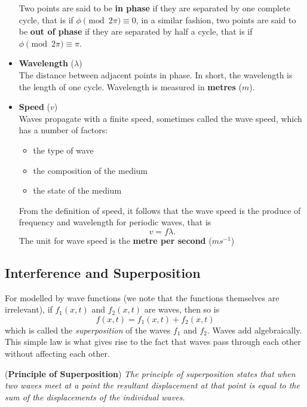 \begin{itemize}
    Two points are said to be \textbf{in phase} if they are separated by one complete cycle, that is if $\phi \pmod{2\pi} \equiv 0$, in a similar fashion, two points are said to be \textbf{out of phase} if they are separated by half a cycle, that is if $\phi \pmod{2\pi} \equiv \pi$. 
    \item \textbf{Wavelength} ($\lambda$) \\
    The distance between adjacent points in phase. In short, the wavelength is the length of one cycle. Wavelength is measured in \textbf{metres} ($m$).
    \item \textbf{Speed} ($v$) \\
    Waves propagate with a finite speed, sometimes called the wave speed, which has a number of factors:
    \begin{itemize}
        \item the type of wave
        \item the composition of the medium
        \item the state of the medium
    \end{itemize}
    From the definition of speed, it follows that the wave speed is the produce of frequency and wavelength for periodic waves, that is 
    \begin{equation}
        v = f \lambda.
    \end{equation}
    The unit for wave speed is the \textbf{metre per second} ($ms^{-1}$)
\end{itemize}

\subsection{Interference and Superposition}

For modelled by wave functions (we note that the functions themselves are irrelevant), if  $f_1(x, t)$ and $f_2(x,t)$ are waves, then so is
\begin{equation}
    f(x, t) = f_1(x, t) + f_2(x, t)
\end{equation}
which is called the \textit{superposition} of the waves $f_1$ and $f_2$. Waves add algebraically. This simple law is what gives rise to the fact that waves pass through each other without affecting each other. 

\begin{theorem}{(\textbf{Principle of Superposition})}
\textit{The principle of superposition states that when two waves meet at a point the resultant displacement at that point is equal to the sum of the displacements of the individual waves.}
\end{theorem}

